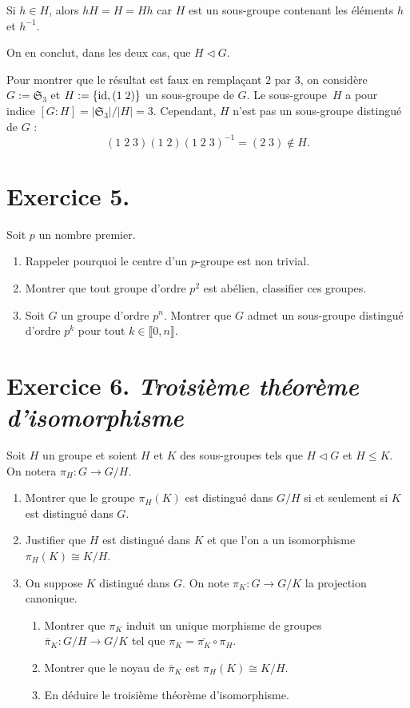 \documentclass[./main]{subfiles}
\begin{document}
  Si $h \in H$, alors $h H = H = H h$ car $H$ est un sous-groupe contenant les éléments $h$ et $h^{-1}$.

  On en conclut, dans les deux cas, que $H \triangleleft G$.

  Pour montrer que le résultat est faux en remplaçant $2$ par $3$, on considère $G := \mathfrak{S}_3$ et $H := \{\operatorname{id}, (1\;2)\}$ un sous-groupe de $G$.
  Le sous-groupe~$H$ a pour indice $[G : H] = |\mathfrak{S}_3| / |H| = 3$.
  Cependant, $H$ n'est pas un sous-groupe distingué de $G$ : \[
    (1\;2\;3)(1\;2)(1\;2\;3)^{-1} = (2\;3) \not\in H
  .\]

  \section{Exercice 5.}
  \begin{enonce}
    Soit $p$ un nombre premier.
    \begin{enumerate}
      \item Rappeler pourquoi le centre d'un $p$-groupe est non trivial.
      \item Montrer que tout groupe d'ordre $p^2$ est abélien, classifier ces groupes.
      \item Soit $G$ un groupe d'ordre $p^n$. Montrer que $G$ admet un sous-groupe distingué d'ordre $p^k$ pour tout $k \in \llbracket 0, n \rrbracket$.
    \end{enumerate}
  \end{enonce}

  \section{Exercice 6. \textit{Troisième théorème d'isomorphisme}}
  \begin{enonce}
    Soit $H$ un groupe et soient $H$ et $K$ des sous-groupes tels que $H \triangleleft G$ et $H \le K$.
    On notera $\pi_H : G \to G/H$.

    \begin{enumerate}
      \item Montrer que le groupe $\pi_H(K)$ est distingué dans $G / H$ si et seulement si $K$ est distingué dans $G$.
      \item Justifier que $H$ est distingué dans $K$ et que l'on a un isomorphisme $\pi_H(K) \cong K / H$.
      \item On suppose $K$ distingué dans $G$. On note $\pi_K : G \to G / K$ la projection canonique.
        \begin{enumerate}
          \item Montrer que $\pi_K$ induit un unique morphisme de groupes~$\bar{\pi}_K : G/H \to G/K$ tel que $\pi_K = \bar{\pi_K} \circ \pi_H$.
          \item Montrer que le noyau de $\bar{\pi}_K$ est $\pi_H(K)\cong K / H$.
          \item En déduire le troisième théorème d'isomorphisme.
        \end{enumerate}
    \end{enumerate}
  \end{enonce}
\end{document}

